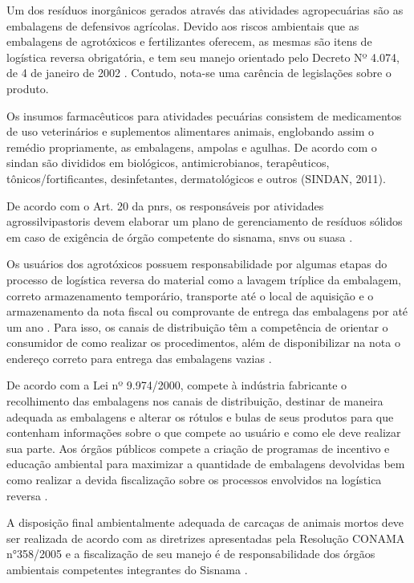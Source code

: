 Um dos resíduos inorgânicos gerados através das atividades agropecuárias são as embalagens de defensivos agrícolas. Devido aos riscos ambientais que as embalagens de agrotóxicos e fertilizantes oferecem, as mesmas são itens de logística reversa obrigatória, e tem seu manejo orientado pelo Decreto Nº 4.074, de 4 de janeiro de 2002 \cite{Brasil4074}. Contudo, nota-se uma carência de legislações sobre o produto.

Os insumos farmacêuticos para atividades pecuárias consistem de medicamentos de uso veterinários e suplementos alimentares animais, englobando assim o remédio propriamente, as embalagens, ampolas e agulhas. De acordo com o \gls{sindan} são divididos em biológicos, antimicrobianos, terapêuticos, tônicos/fortificantes, desinfetantes, dermatológicos e outros (SINDAN, 2011).

De acordo com o Art. 20 da \gls{pnrs}, os responsáveis por atividades agrossilvipastoris devem elaborar um plano de gerenciamento de resíduos sólidos em caso de exigência de órgão competente do \gls{sisnama}, \gls{snvs} ou \gls{suasa} \cite{brasil:12305}.

Os usuários dos agrotóxicos possuem responsabilidade por algumas etapas do processo de logística reversa do material como a lavagem tríplice da embalagem, correto armazenamento temporário, transporte até o local de aquisição e o armazenamento da nota fiscal ou comprovante de entrega das embalagens por até um ano \cite{Brasil9974}. Para isso, os canais de distribuição têm a competência de orientar o consumidor de como realizar os procedimentos, além de disponibilizar na nota o endereço correto para entrega das embalagens vazias \cite{conama:334}.

De acordo com a Lei nº 9.974/2000, compete à indústria fabricante o recolhimento das embalagens nos canais de distribuição, destinar de maneira adequada as embalagens e alterar os rótulos e bulas de seus produtos para que contenham informações sobre o que compete ao usuário e como ele deve realizar sua parte. Aos órgãos públicos compete a criação de programas de incentivo e educação ambiental para maximizar a quantidade de embalagens devolvidas bem como realizar a devida fiscalização sobre os processos envolvidos na logística reversa \cite{Brasil9974}.

A disposição final ambientalmente adequada de carcaças de animais mortos deve ser realizada de acordo com as diretrizes apresentadas pela Resolução CONAMA n°358/2005 e a fiscalização de seu manejo é de responsabilidade dos órgãos ambientais competentes integrantes do Sisnama \cite{brasil:12305}.

